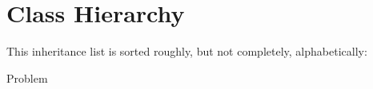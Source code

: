 \section{Class Hierarchy}
This inheritance list is sorted roughly, but not completely, alphabetically\+:\begin{DoxyCompactList}
\item Problem\begin{DoxyCompactList}
\item {}
\end{DoxyCompactList}
\end{DoxyCompactList}
